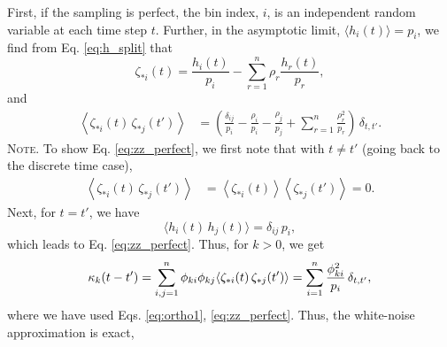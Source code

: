 \documentclass[reprint, floatfix]{revtex4-1}
\newcommand{\note}[1]{{\color{DarkGreen}\footnotesize \textsc{Note.} #1}}
\begin{document}
First, if the sampling is perfect,
%
%
the bin index, $i$, is an independent random variable
at each time step $t$.
%
Further, in the asymptotic limit,
$\langle h_i(t) \rangle = p_i$,
we find from Eq. \eqref{eq:h_split} that
\begin{equation*}
  \zeta_{*i}(t)
  =
  \frac{ h_i(t) } { p_i }
  -
  \sum_{ r = 1 }^n
    \rho_r \frac{ h_r(t) } { p_r }
  ,
\end{equation*}
%
and
%
\begin{align}
  \left\langle
    \zeta_{*i}(t) \, \zeta_{*j}(t')
  \right\rangle
  &=
  \left(
    \frac{ \delta_{ij} } { p_i }
    -
    \frac{ \rho_i } { p_i }
    -
    \frac{ \rho_j } { p_j }
    +
    \sum_{r = 1}^n
    \frac{ \rho_r^2 } { p_r }
  \right) \,
  \delta_{t, t'}
  .
\label{eq:zz_perfect}
\end{align}
%
%
\note{To show Eq. \eqref{eq:zz_perfect}, we first note that
  with $t \ne t'$ (going back to the discrete time case),
  $$
  \begin{aligned}
  \left\langle
    \zeta_{*i}(t) \, \zeta_{*j}(t')
  \right\rangle
  &=
  \left\langle
    \zeta_{*i}(t)
  \right\rangle
  \left\langle
    \zeta_{*j}(t')
  \right\rangle
  =
  0.
  \end{aligned}
  $$
  Next, for $t = t'$, we have
  $$
  \langle
    h_i(t) \, h_j(t)
  \rangle
  = \delta_{ij} \, p_i
  ,
  $$
  which leads to Eq. \eqref{eq:zz_perfect}.
}
%
Thus,
for $k > 0$, we get
%
\begin{equation}
  \kappa_k(t - t')
  =
  \sum_{i,j = 1}^n
  \phi_{ki} \phi_{kj}
  \langle \zeta_{*i}(t) \, \zeta_{*j}(t') \rangle
  =
  \sum_{i = 1}^n \frac{ \phi_{ki}^2 } { p_i }
  \, \delta_{t, t'},
\notag
\end{equation}
%
where we have used
Eqs. \eqref{eq:ortho1},
\eqref{eq:zz_perfect}.
%
Thus, the white-noise approximation is exact,
\end{document}
